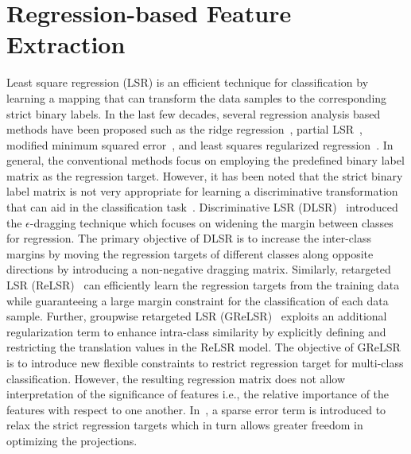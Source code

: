 \section{Regression-based Feature Extraction}
\label{sec: Chap2_LSR}
%
Least square regression (LSR) is an efficient technique for classification by learning a mapping that can transform the data samples to the corresponding strict binary labels. In the last few decades, several regression analysis based methods have been proposed such as the ridge regression~\cite{Ridge_Regression,Kernel_ridge_PCA},
partial LSR~\cite{Partial_LS}, modified minimum squared error~\cite{Modified_MSE}, and least squares regularized regression~\cite{LS_RR}. In general, the conventional methods focus on employing the predefined binary label matrix as the regression target. However, it has been noted that the strict binary label matrix is not very appropriate for learning a discriminative transformation that can aid in the classification task~\cite{DLSR,ReLSR,GReLSR}. Discriminative LSR (DLSR)~\cite{DLSR} introduced the $\epsilon$-dragging technique which focuses on widening the margin between classes for regression. The primary objective of DLSR is to increase the inter-class margins by moving the regression targets of different classes along opposite directions by introducing a non-negative dragging matrix. Similarly, retargeted LSR (ReLSR)~\cite{ReLSR} can efficiently learn the regression targets from the training data while guaranteeing a large margin constraint for the classification of each data sample. Further, groupwise retargeted LSR (GReLSR)~\cite{GReLSR} %
exploits an additional regularization term to enhance intra-class similarity by explicitly defining and restricting the translation values in the ReLSR model. The objective of GReLSR is to introduce new flexible constraints to restrict regression target for multi-class classification. However, the resulting regression matrix does not allow interpretation of the significance of features i.e., the relative importance of the features with respect to one another. In~\cite{ICS_DLSR}, a sparse error term is introduced to relax the strict regression targets which in turn allows greater freedom in optimizing the projections. 

